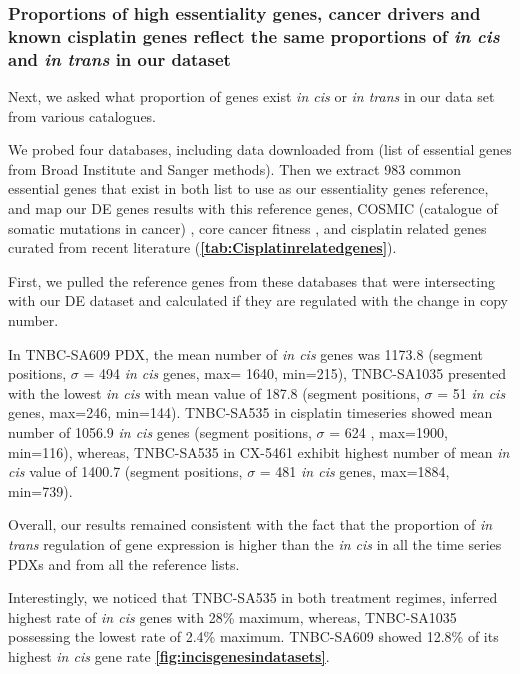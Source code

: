 
\subsubsection{Proportions of high essentiality genes, cancer drivers and known cisplatin genes reflect the same proportions of \textit{in cis} and \textit{in trans} in our dataset}

Next, we asked what proportion of genes exist \textit{in cis} or \textit{in trans} in our data set from various catalogues. 


We probed four databases, including data downloaded from \cite{dempster2019agreement} (list of essential genes from Broad Institute and Sanger methods). Then we extract 983 common essential genes that exist in both list to use as our essentiality genes reference, and map our DE genes results with this reference genes, COSMIC (catalogue of somatic mutations in cancer) \cite{forbes2010cosmic}, core cancer fitness \cite{behan2019prioritization}, and cisplatin related genes curated from recent literature (\textbf{\autoref{tab:Cisplatinrelatedgenes}}).

First, we pulled the reference genes from these databases that were intersecting with our \ac{DE} dataset and calculated if they are regulated with the change in copy number.

 In TNBC-SA609 PDX, the mean number of \textit{in cis} genes was 1173.8 (segment positions, $\sigma$ = 494 \textit{in cis} genes, max= 1640, min=215), TNBC-SA1035 presented with the lowest \textit{in cis} with
 mean value of 187.8 (segment positions, $\sigma$ = 51 \textit{in cis} genes, max=246, min=144). TNBC-SA535 in cisplatin timeseries showed mean number of 1056.9 \textit{in cis} genes (segment positions, $\sigma$ = 624 , max=1900, min=116), whereas, TNBC-SA535 in CX-5461 exhibit highest number of mean \textit{in cis} value of 1400.7 (segment positions, $\sigma$ = 481 \textit{in cis} genes, max=1884, min=739).
 
 Overall, our results remained consistent with the fact that the proportion of \textit{in trans} regulation of gene expression is higher than the \textit{in cis} in all the time series PDXs and from all the reference lists.   
 
 Interestingly, we noticed that TNBC-SA535 in both treatment regimes, inferred highest rate of \textit{in cis} genes with 28\% maximum, whereas, TNBC-SA1035 possessing the lowest rate of 2.4\% maximum. TNBC-SA609 showed 12.8\% of its highest \textit{in cis} gene rate \textbf{\autoref{fig:incisgenesindatasets}}.



